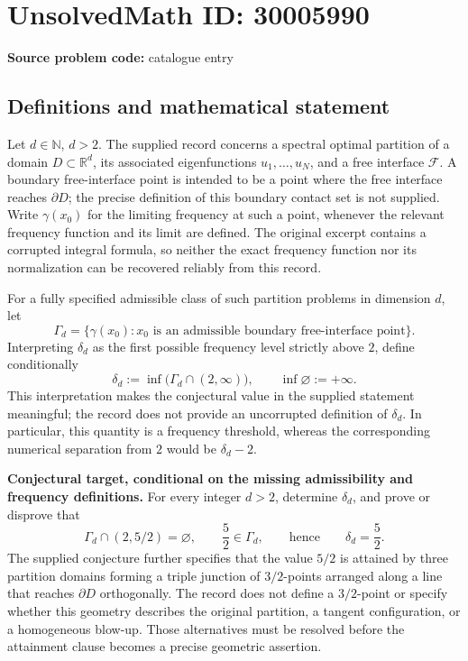 \documentclass[11pt]{article}
\newcommand{\N}{\mathbb{N}}
\newcommand{\R}{\mathbb{R}}
\begin{document}
\section*{UnsolvedMath ID: 30005990}
\textbf{Source problem code:} catalogue entry
\subsection{Definitions and mathematical statement}
Let \(d\in\N\), \(d>2\). The supplied record concerns a spectral optimal partition of a domain \(D\subset\R^d\), its associated eigenfunctions \(u_1,\ldots,u_N\), and a free interface \(\mathcal F\). A boundary free-interface point is intended to be a point where the free interface reaches \(\partial D\); the precise definition of this boundary contact set is not supplied. Write \(\gamma(x_0)\) for the limiting frequency at such a point, whenever the relevant frequency function and its limit are defined. The original excerpt contains a corrupted integral formula, so neither the exact frequency function nor its normalization can be recovered reliably from this record.

For a fully specified admissible class of such partition problems in dimension \(d\), let
\[
\Gamma_d=\{\gamma(x_0):x_0\text{ is an admissible boundary free-interface point}\}.
\]
Interpreting \(\delta_d\) as the first possible frequency level strictly above \(2\), define conditionally
\[
\delta_d:=\inf\bigl(\Gamma_d\cap(2,\infty)\bigr),
\qquad \inf\varnothing:=+\infty.
\]
This interpretation makes the conjectural value in the supplied statement meaningful; the record does not provide an uncorrupted definition of \(\delta_d\). In particular, this quantity is a frequency threshold, whereas the corresponding numerical separation from \(2\) would be \(\delta_d-2\).

\textbf{Conjectural target, conditional on the missing admissibility and frequency definitions.} For every integer \(d>2\), determine \(\delta_d\), and prove or disprove that
\[
\Gamma_d\cap(2,5/2)=\varnothing,
\qquad \frac52\in\Gamma_d,
\qquad\text{hence}\qquad \delta_d=\frac52.
\]
The supplied conjecture further specifies that the value \(5/2\) is attained by three partition domains forming a triple junction of \(3/2\)-points arranged along a line that reaches \(\partial D\) orthogonally. The record does not define a \(3/2\)-point or specify whether this geometry describes the original partition, a tangent configuration, or a homogeneous blow-up. Those alternatives must be resolved before the attainment clause becomes a precise geometric assertion.
\end{document}
